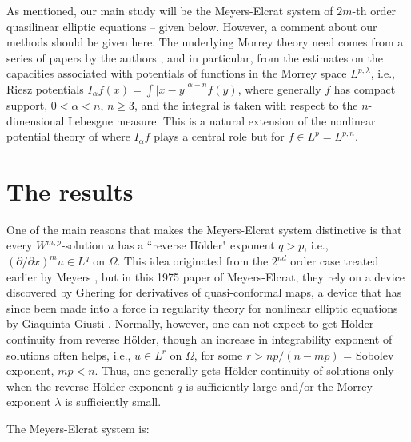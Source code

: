 \documentclass[12pt]{amsart}
\begin{document}
As mentioned, our main study will be the Meyers-Elcrat system of $2m$-th order quasilinear elliptic equations -- given below. However, a comment about our methods should be given here. The underlying Morrey theory need comes from a series of papers by the authors \cite{AX2004, AX2011a, AX2011b, AX2011c}, and in particular, from the estimates on the capacities associated with potentials of functions in the Morrey space $L^{p,\lambda}$, i.e., Riesz potentials
$I_\alpha f(x)=\int |x-y|^{\alpha-n}f(y)$, where generally $f$ has compact support, $0<\alpha<n$, $n\ge 3$, and the integral is taken with respect to the $n$-dimensional Lebesgue measure. This is a natural extension of the nonlinear potential theory of \cite{AH1996} where $I_\alpha f$ plays a central role but for $f\in L^p=L^{p,n}$.

\section{The results}\label{s2}
\setcounter{equation}{0}

One of the main reasons that makes the Meyers-Elcrat system distinctive is that every $W^{m,p}$-solution $u$ has a ``reverse H\"older" exponent $q>p$, i.e., $(\partial/\partial x)^m u\in L^{q}$ on $\Omega$. This idea originated from the $2^{nd}$ order case treated earlier by Meyers \cite{M1963}, but in this 1975 paper of Meyers-Elcrat, they rely on a device discovered by Ghering \cite{G1973} for derivatives of quasi-conformal maps, a device that has since been made into a force in regularity theory for nonlinear elliptic equations by Giaquinta-Giusti \cite{GG1982}. Normally, however, one can not expect to get H\"older continuity from reverse H\"older, though an increase in integrability exponent of solutions often helps, i.e., $u\in L^r$ on $\Omega$, for some $r>np/(n-mp)$ = Sobolev exponent, $mp<n$. Thus, one generally gets H\"older continuity of solutions only when the reverse H\"older exponent $q$ is sufficiently large and/or the Morrey exponent $\lambda$ is sufficiently small.

The Meyers-Elcrat system is:
\end{document}
